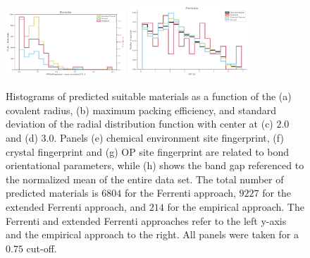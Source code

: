 \documentclass[superscriptaddress,unsortedaddress,
 amsmath,amssymb,
 aps,
]{revtex4-2}
\begin{document}
\begin{figure}[h!]
    \includegraphics[width=0.4\textwidth]{figures/histograms/new/OPSiteFingerprint_mean tetrahedral CN_4_count_075.pdf} 
    \includegraphics[width=0.4\textwidth]{figures/histograms/new/MP_Eg_normalized_databackgrund_075.pdf} 
    \caption{Histograms of predicted suitable materials as a function of the (a) covalent radius, (b) maximum packing efficiency, and standard deviation of the radial distribution function with center at (c) $2.0$ and (d) $3.0$. Panels (e) chemical environment site fingerprint, (f) crystal fingerprint and (g) OP site fingerprint are related to bond orientational parameters, while (h) shows the band gap referenced to the normalized mean of the entire data set. The total number of predicted materials is  $6804$ for the Ferrenti approach, $9227$ for the extended Ferrenti approach, and $214$ for the empirical approach. The Ferrenti and extended Ferrenti approaches refer to the left y-axis and the empirical approach to the right. All panels were taken for a $0.75$ cut-off. }
    \label{fig:histograms_supp}
\end{figure} 

\newpage 
 
\end{document}

